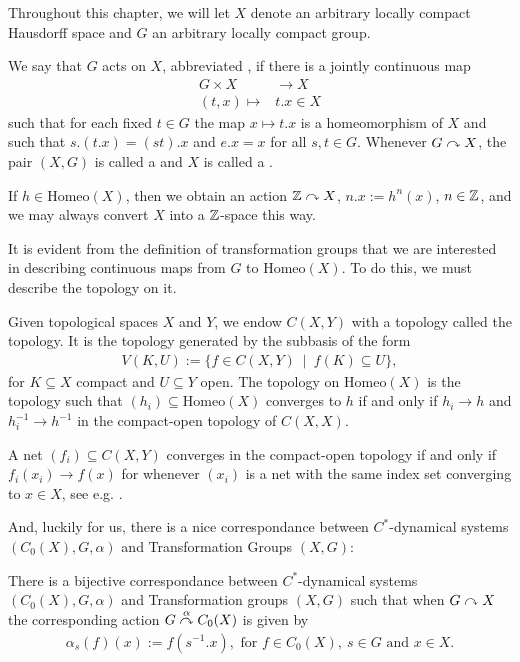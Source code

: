 Throughout this chapter, we will let $X$ denote an arbitrary locally compact Hausdorff space and $G$ an arbitrary locally compact group. 
\begin{definition}
	We say that $G$ acts on $X$, abbreviated , if there is a jointly continuous map
	\begin{align*}
		G \times X &\to X\\
		(t,x) \mapsto &t.x \in X
	\end{align*}
	such that for each fixed $t \in G$ the map $x \mapsto t.x$ is a homeomorphism of $X$ and such that $s.(t.x) = (st).x$ and $e.x = x$ for all $s,t \in G$. Whenever $G \stackrel{}{\curvearrowright} X$, the pair $(X,G)$ is called a  and $X$ is called a .
\end{definition}
\begin{example}
	If $h \in \mathrm{Homeo}(X)$, then we obtain an action $\mathbb{Z}  \stackrel{}{\curvearrowright} X$, $n.x := h^n(x)$, $n \in \mathbb{Z}$, and we may always convert $X$ into a $\mathbb{Z}$-space this way.
\end{example}
It is evident from the definition of transformation groups that we are interested in describing continuous maps from $G$ to $\mathrm{Homeo}(X)$. To do this, we must describe the topology on it.
\begin{definition}
	Given topological spaces $X$ and $Y$, we endow $C(X,Y)$ with a topology called the  topology. It is the topology generated by the subbasis of the form
	\begin{align*}
		V(K,U) := \{ f \in C(X,Y) \ \mid \ f(K) \subseteq U\},
	\end{align*}
	for $K \subseteq X$ compact and $U \subseteq Y$ open. The topology on $\mathrm{Homeo}(X)$ is the topology such that $(h_i) \subseteq \mathrm{Homeo}(X)$ converges to $h$ if and only if $h_i \to h$ and $h_i^{-1} \to h^{-1}$ in the compact-open topology of $C(X,X)$.
\end{definition}
\begin{remark}
	A net $(f_i) \subseteq C(X,Y)$ converges in the compact-open topology if and only if $f_i(x_i) \to f(x)$ for whenever $(x_i)$ is a net with the same index set converging to $x \in X$, see e.g. \cite[Lemma 1.30]{williamscrossed}.
\end{remark}
And, luckily for us, there is a nice correspondance between $C^*$-dynamical systems $(C_0(X),G,\alpha)$ and Transformation Groups $(X,G)$:
\begin{proposition}
	There is a bijective correspondance between $C^*$-dynamical systems $(C_0(X),G,\alpha)$ and Transformation groups $(X,G)$ such that when $G \stackrel{}{\curvearrowright} X$ the corresponding action $G \stackrel{\alpha}{\curvearrowright} C_0(X)$ is given by
	\begin{align*}
		\alpha_s(f)(x):= f(s^{-1}.x), \text{ for } f \in C_0(X), \ s \in G \text{ and } x \in X.
	\end{align*}
	\label{dynamiccorr}
\end{proposition}

